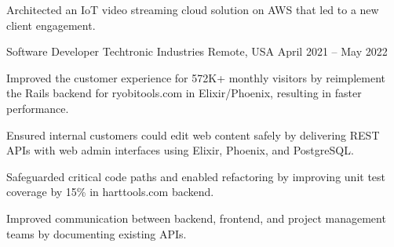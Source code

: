 \begin{cventries}
{\begin{cvitems}
			\item Architected an IoT video streaming cloud solution on AWS that
			led to a new client engagement.
		\end{cvitems}
	}

	\cventry
	{Software Developer} %
	{Techtronic Industries} %
	{Remote, USA} %
	{April 2021 -- May 2022} %
	{
		\begin{cvitems}
			\item Improved the customer experience for 572K+ monthly visitors by
			reimplement the Rails backend for ryobitools.com in Elixir/Phoenix,
			resulting in faster performance.
			\columnbreak
			\item Ensured internal customers could edit web content safely by
			delivering REST APIs with web admin interfaces using Elixir, Phoenix,
			and PostgreSQL.
			\item Safeguarded critical code paths and enabled refactoring by improving
			unit test coverage by 15\% in harttools.com backend.
			\item Improved communication between backend, frontend, and project
			management teams by documenting existing APIs.
		\end{cvitems}
	}


\end{cventries}
